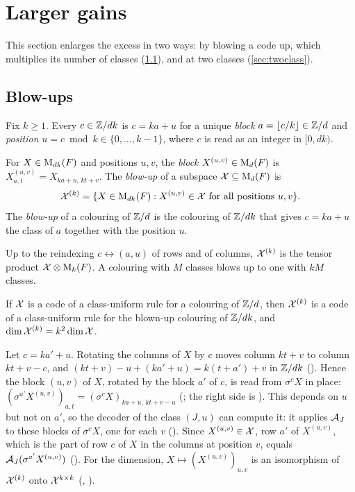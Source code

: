 \section{Larger gains}\label{sec:gains}

This section enlarges the excess in two ways: by blowing a code up, which multiplies its number of classes
(\cref{sec:blowup}), and at two classes (\cref{sec:twoclass}).

\subsection{Blow-ups}\label{sec:blowup}

Fix $k\ge1$. Every $c\in\mathbb{Z}/dk$ is $c=ka+u$ for a unique \emph{block} $a=\lfloor c/k\rfloor\in\mathbb{Z}/d$ and \emph{position}
$u=c\bmod k\in\{0,\dots,k-1\}$, where $c$ is read as an integer in $[0,dk)$.

\begin{definition}\label{def:blowup}
For $X\in\mathrm{M}_{dk}(F)$ and positions $u,v$, the \emph{block} $X^{(u,v)}\in\mathrm{M}_d(F)$ is
$X^{(u,v)}_{a,t}=X_{ka+u,\,kt+v}$. The \emph{blow-up} of a subspace $\mathcal{X}\subseteq\mathrm{M}_d(F)$ is
\[
  \mathcal{X}^{(k)}=\{X\in\mathrm{M}_{dk}(F):X^{(u,v)}\in\mathcal{X}\text{ for all positions }u,v\}.
\]
The \emph{blow-up} of a colouring of $\mathbb{Z}/d$ is the colouring of $\mathbb{Z}/dk$ that gives $c=ka+u$ the class of $a$ together
with the position $u$.
\end{definition}

Up to the reindexing $c\leftrightarrow(a,u)$ of rows and of columns, $\mathcal{X}^{(k)}$ is the tensor product
$\mathcal{X}\otimes\mathrm{M}_k(F)$. A colouring with $M$ classes blows up to one with $kM$ classes.

\begin{theorem}\label{thm:blowup}
If $\mathcal{X}$ is a code of a class-uniform rule for a colouring of $\mathbb{Z}/d$, then $\mathcal{X}^{(k)}$ is a code of a class-uniform rule
for the blown-up colouring of $\mathbb{Z}/dk$, and $\dim\mathcal{X}^{(k)}=k^2\dim\mathcal{X}$.
\end{theorem}

\begin{outline}
Let $c=ka'+u$. Rotating the columns of $X$ by $c$ moves column $kt+v$ to column $kt+v-c$, and
$(kt+v)-u+(ka'+u)=k(t+a')+v$ in $\mathbb{Z}/dk$ (). Hence the block $(u,v)$ of $X$, rotated by the block
$a'$ of $c$, is read from $\sigma^cX$ in place: $(\sigma^{a'}X^{(u,v)})_{a,t}=(\sigma^cX)_{ka+u,\,kt+v-u}$
(; the right side is ). This depends on $u$ but not on $a'$, so the decoder of the class
$(J,u)$ can compute it: it applies $\mathcal{A}_J$ to these blocks of $\sigma^cX$, one for each $v$ (). Since
$X^{(u,v)}\in\mathcal{X}$, row $a'$ of $X^{(u,v)}$, which is the part of row $c$ of $X$ in the columns at position $v$, equals
$\mathcal{A}_J(\sigma^{a'}X^{(u,v)})$ (). For the dimension, $X\mapsto(X^{(u,v)})_{u,v}$ is an
isomorphism of $\mathcal{X}^{(k)}$ onto $\mathcal{X}^{k\times k}$ (, ).
\end{outline}

